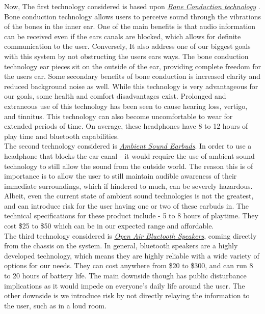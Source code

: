 \noindent Now, The first technology considered is based upon \underline{\textit{Bone Conduction technology}} \cite{BoneConductionRef}. Bone conduction technology allows users to perceive sound through the vibrations of the bones in the inner ear. One of the main benefits is that audio information can be received even if the ears canals are blocked, which allows for definite communication to the user. Conversely, It also address one of our biggest goals with this system by not obstructing the users ears ways. The bone conduction technology ear pieces sit on the outside of the ear, providing complete freedom for the users ear. Some secondary benefits of bone conduction is increased clarity and reduced background noise as well. While this technology is very advantageous for our goals, some health and comfort disadvantages exist. Prolonged and extraneous use of this technology has been seen to cause hearing loss, vertigo, and tinnitus. This technology can also become uncomfortable to wear for extended periods of time. On average, these headphones have 8 to 12 hours of play time and bluetooth capabilities.  \\

\noindent The second technology considered is \underline{\textit{Ambient Sound Earbuds}}. In order to use a headphone that blocks the ear canal - it would require the use of ambient sound technology to still allow the sound from the outside world. The reason this is of importance is to allow the user to still maintain audible awareness of their immediate surroundings, which if hindered to much, can be severely hazardous. Albeit, even the current state of ambient sound technologies is not the greatest, and can introduce risk for the user having one or two of these earbuds in. The technical  specifications for these product include - 5 to 8 hours of playtime. They cost \$25 to \$50 which can be in our expected range and affordable. \\

\noindent The third technology considered is \underline{\textit{Open Air Bluetooth Speakers}}, coming directly from the chassis on the system. In general, bluetooth speakers are a highly developed technology, which means they are highly reliable with a wide variety of options for our needs. They can cost anywhere from \$20 to \$300, and can run 8 to 20 hours of battery life. The main downside though has public disturbance implications as it would impede on everyone's daily life around the user. The other downside is we introduce risk by not directly relaying the information to the user, such as in a loud room. \\

